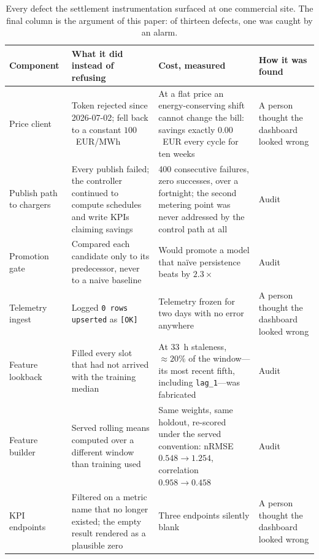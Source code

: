 \begin{table}[t]
\centering
\caption{Every defect the settlement instrumentation surfaced at one commercial
site. The final column is the argument of this paper: of thirteen defects, one
was caught by an alarm.}
\label{tab:defects}
\footnotesize
\setlength{\tabcolsep}{4pt}
\begin{tabular}{@{}p{}p{}p{}p{}@{}}
\toprule
\textbf{Component} & \textbf{What it did instead of refusing} &
\textbf{Cost, measured} & \textbf{How it was found} \\
\midrule

Price client &
Token rejected since 2026-07-02; fell back to a constant
$100$~EUR/MWh &
At a flat price an energy-conserving shift cannot change the bill:
savings exactly $0.00$~EUR every cycle for ten weeks &
A person thought the dashboard looked wrong \\

\addlinespace
Publish path to chargers &
Every publish failed; the controller continued to compute schedules and write
KPIs claiming savings &
400 consecutive failures, zero successes, over a fortnight; the second
metering point was never addressed by the control path at all &
Audit \\

\addlinespace
Promotion gate &
Compared each candidate only to its predecessor, never to a naive baseline &
Would promote a model that na\"ive persistence beats by $2.3\times$ &
Audit \\

\addlinespace
Telemetry ingest &
Logged \texttt{0 rows upserted} as \texttt{[OK]} &
Telemetry frozen for two days with no error anywhere &
A person thought the dashboard looked wrong \\

\addlinespace
Feature lookback &
Filled every slot that had not arrived with the training median &
At $33$~h staleness, ${\approx}20\%$ of the window---its most recent
fifth, including \texttt{lag\_1}---was fabricated &
Audit \\

\addlinespace
Feature builder &
Served rolling means computed over a different window than training used &
Same weights, same holdout, re-scored under the served convention: nRMSE
$0.548 \rightarrow 1.254$, correlation $0.958 \rightarrow 0.458$ &
Audit \\

\addlinespace
KPI endpoints &
Filtered on a metric name that no longer existed; the empty result rendered as
a plausible zero &
Three endpoints silently blank &
A person thought the dashboard looked wrong \\


\end{tabular}
\end{table}
